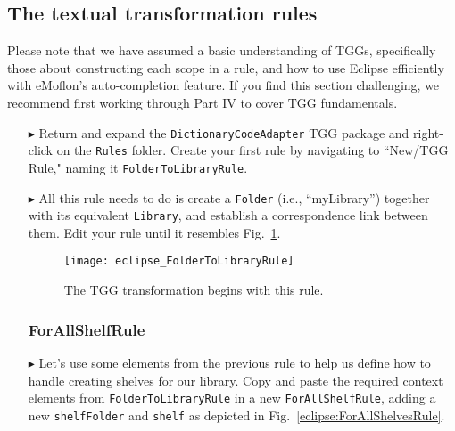 \newpage
\hypertarget{treeToModel tex}{}
\subsection{The textual transformation rules}
\texHeader

Please note that we have assumed a basic understanding of TGGs, specifically those about constructing each scope in a rule, and how to use Eclipse efficiently
with eMoflon's auto-completion feature. If you find this section challenging, we recommend first working through Part IV to cover TGG fundamentals.

\begin{itemize}

\subsubsection{FolderToLibraryRule} %

\item[$\blacktriangleright$] Return and expand the \texttt{DictionaryCodeAdapter} TGG package and right-click on the \texttt{Rules} folder. Create your first
rule by navigating to ``New/TGG Rule," naming it \texttt{Folder\-To\-Lib\-rary\-Rule}.

\item[$\blacktriangleright$] All this rule needs to do is create a \texttt{Folder} (i.e., ``myLibrary'') together with its equivalent \texttt{Library}, and
establish a correspondence link between them. Edit your rule until it resembles Fig.~\ref{eclipse:FolderToLibraryRule}.

\vspace{0.5cm}

\begin{figure}[htbp]
\begin{center}
  \texttt{[image: eclipse\_FolderToLibraryRule]}
  \caption{The TGG transformation begins with this rule.}
  \label{eclipse:FolderToLibraryRule}
\end{center}
\end{figure}

\vspace{-0.5cm}

\subsubsection{ForAllShelfRule} %

\item[$\blacktriangleright$] Let's use some elements from the previous rule to help us define how to handle creating shelves for our library. Copy and paste the
required context elements from \texttt{FolderToLibraryRule} in a new \texttt{ForAllShelfRule}, adding a new \texttt{shelfFolder} and \texttt{shelf} as depicted
in Fig.~\ref{eclipse:ForAllShelvesRule}.


\end{itemize}
